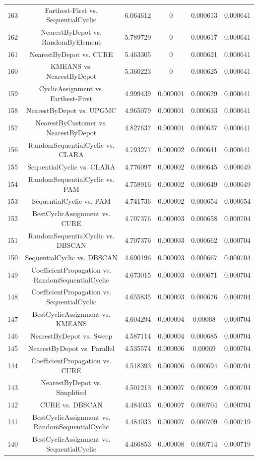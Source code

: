 \documentclass[a4paper,10pt]{article}
\begin{document}
\begin{landscape}
\begin{table}[!htp]
\begin{tabular}{cccccc}
163&Farthest-First vs. SequentialCyclic&6.064612&0&0.000613&0.000641\\
162&NearestByDepot vs. RandomByElement&5.789729&0&0.000617&0.000641\\
161&NearestByDepot vs. CURE&5.463305&0&0.000621&0.000641\\
160&KMEANS vs. NearestByDepot&5.360223&0&0.000625&0.000641\\
159&CyclicAssignment vs. Farthest-First&4.999439&0.000001&0.000629&0.000641\\
158&NearestByDepot vs. UPGMC&4.965079&0.000001&0.000633&0.000641\\
157&NearestByCustomer vs. NearestByDepot&4.827637&0.000001&0.000637&0.000641\\
156&RandomSequentialCyclic vs. CLARA&4.793277&0.000002&0.000641&0.000641\\
155&SequentialCyclic vs. CLARA&4.776097&0.000002&0.000645&0.000649\\
154&RandomSequentialCyclic vs. PAM&4.758916&0.000002&0.000649&0.000649\\
153&SequentialCyclic vs. PAM&4.741736&0.000002&0.000654&0.000654\\
152&BestCyclicAssignment vs. CURE&4.707376&0.000003&0.000658&0.000704\\
151&RandomSequentialCyclic vs. DBSCAN&4.707376&0.000003&0.000662&0.000704\\
150&SequentialCyclic vs. DBSCAN&4.690196&0.000003&0.000667&0.000704\\
149&CoefficientPropagation vs. RandomSequentialCyclic&4.673015&0.000003&0.000671&0.000704\\
148&CoefficientPropagation vs. SequentialCyclic&4.655835&0.000003&0.000676&0.000704\\
147&BestCyclicAssignment vs. KMEANS&4.604294&0.000004&0.00068&0.000704\\
146&NearestByDepot vs. Sweep&4.587114&0.000004&0.000685&0.000704\\
145&NearestByDepot vs. Parallel&4.535574&0.000006&0.00069&0.000704\\
144&CoefficientPropagation vs. CURE&4.518393&0.000006&0.000694&0.000704\\
143&NearestByDepot vs. Simplified&4.501213&0.000007&0.000699&0.000704\\
142&CURE vs. DBSCAN&4.484033&0.000007&0.000704&0.000704\\
141&BestCyclicAssignment vs. RandomSequentialCyclic&4.484033&0.000007&0.000709&0.000719\\
140&BestCyclicAssignment vs. SequentialCyclic&4.466853&0.000008&0.000714&0.000719\\

\end{tabular}
\end{table}
\end{landscape}
\end{document}
